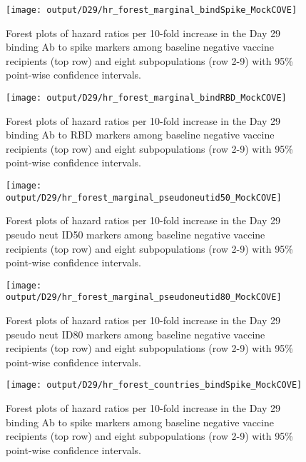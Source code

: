 \documentclass[
]{article}
\begin{document}
\begin{figure}[H]
    \centering
    \texttt{[image: output/D29/hr\_forest\_marginal\_bindSpike\_MockCOVE]}
    \caption{Forest plots of hazard ratios per 10-fold increase in the Day 29 binding Ab to spike markers among baseline negative vaccine recipients (top row) and eight subpopulations (row 2-9) with 95\% point-wise confidence intervals.}
\end{figure}

\begin{figure}[H]
    \centering
    \texttt{[image: output/D29/hr\_forest\_marginal\_bindRBD\_MockCOVE]}
    \caption{Forest plots of hazard ratios per 10-fold increase in the  Day 29 binding Ab to RBD markers among baseline negative vaccine recipients (top row) and eight subpopulations (row 2-9) with 95\% point-wise confidence intervals.}
\end{figure}

\ifENSEMBLE
\else

\begin{figure}[H]
    \centering
    \texttt{[image: output/D29/hr\_forest\_marginal\_pseudoneutid50\_MockCOVE]}
    \caption{Forest plots of hazard ratios per 10-fold increase in the  Day 29 pseudo neut ID50 markers among baseline negative vaccine recipients (top row) and eight subpopulations (row 2-9) with 95\% point-wise confidence intervals.}
\end{figure}

\begin{figure}[H]
    \centering
    \texttt{[image: output/D29/hr\_forest\_marginal\_pseudoneutid80\_MockCOVE]}
    \caption{Forest plots of hazard ratios per 10-fold increase in the  Day 29 pseudo neut ID80 markers among baseline negative vaccine recipients (top row) and eight subpopulations (row 2-9) with 95\% point-wise confidence intervals.}
\end{figure}

\fi

\clearpage

\newif\ifShowCountry

\ifShowCountry

\begin{figure}[H]
    \centering
    \texttt{[image: output/D29/hr\_forest\_countries\_bindSpike\_MockCOVE]}
    \caption{Forest plots of hazard ratios per 10-fold increase in the Day 29 binding Ab to spike markers among baseline negative vaccine recipients (top row) and eight subpopulations (row 2-9) with 95\% point-wise confidence intervals.}
\end{figure}
\end{document}
